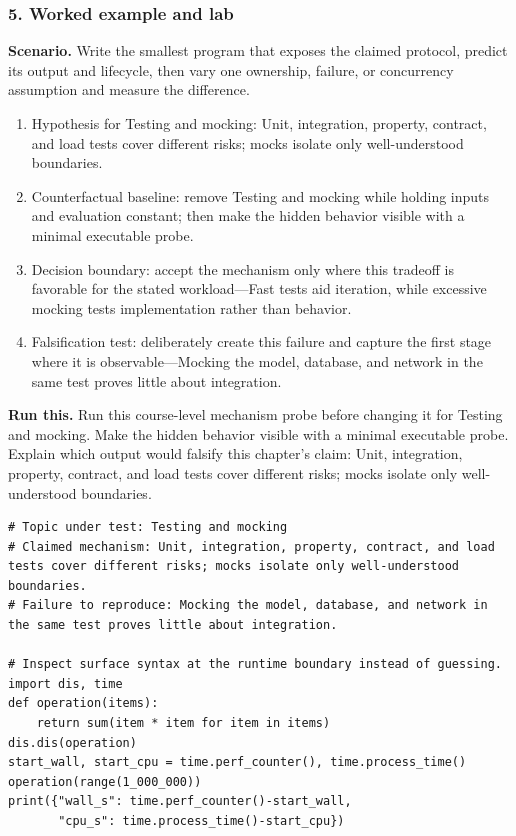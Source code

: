 \subsubsection*{5. Worked example and lab}
\textbf{Scenario.} Write the smallest program that exposes the claimed protocol, predict its output and lifecycle, then vary one ownership, failure, or concurrency assumption and measure the difference.
\begin{enumerate}
\item Hypothesis for Testing and mocking: Unit, integration, property, contract, and load tests cover different risks; mocks isolate only well-understood boundaries.
\item Counterfactual baseline: remove Testing and mocking while holding inputs and evaluation constant; then make the hidden behavior visible with a minimal executable probe.
\item Decision boundary: accept the mechanism only where this tradeoff is favorable for the stated workload—Fast tests aid iteration, while excessive mocking tests implementation rather than behavior.
\item Falsification test: deliberately create this failure and capture the first stage where it is observable—Mocking the model, database, and network in the same test proves little about integration.
\end{enumerate}
\textbf{Run this.} Run this course-level mechanism probe before changing it for Testing and mocking. Make the hidden behavior visible with a minimal executable probe. Explain which output would falsify this chapter's claim: Unit, integration, property, contract, and load tests cover different risks; mocks isolate only well-understood boundaries.
\begin{Verbatim}[fontsize=\scriptsize]
# Topic under test: Testing and mocking
# Claimed mechanism: Unit, integration, property, contract, and load tests cover different risks; mocks isolate only well-understood boundaries.
# Failure to reproduce: Mocking the model, database, and network in the same test proves little about integration.

# Inspect surface syntax at the runtime boundary instead of guessing.
import dis, time
def operation(items):
    return sum(item * item for item in items)
dis.dis(operation)
start_wall, start_cpu = time.perf_counter(), time.process_time()
operation(range(1_000_000))
print({"wall_s": time.perf_counter()-start_wall,
       "cpu_s": time.process_time()-start_cpu})
\end{Verbatim}
